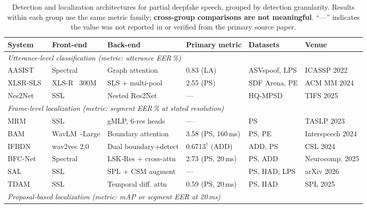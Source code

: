 \documentclass[journal]{IEEEtran}
\begin{document}
\begin{table}[t]
\centering
\caption{Detection and localization architectures for partial deepfake speech, grouped by detection granularity. Results within each group use the same metric family; \textbf{cross-group comparisons are not meaningful}. ``---'' indicates the value was not reported in or verified from the primary source paper.}
\label{tab:architectures}
\small
\begin{tabular}{llllll}
\toprule
\textbf{System} & \textbf{Front-end} & \textbf{Back-end} & \textbf{Primary metric} & \textbf{Datasets} & \textbf{Venue} \\
\midrule
\multicolumn{6}{l}{\textit{Utterance-level classification (metric: utterance EER\,\%)}} \\
\midrule
AASIST~\cite{jung2022aasist}       & Spectral   & Graph attention     & 0.83 (LA)  & ASVspoof, LPS         & ICASSP 2022 \\
XLSR-SLS~\cite{zhang2024xlrsls}    & XLS-R~\cite{babu2022xlsr} 300M & SLS + multi-pool    & 2.55 (PS)  & SDF Arena, PE         & ACM MM 2024 \\
Nes2Net~\cite{liu2025nes2net}      & SSL        & Nested Res2Net      & ---        & HQ-MPSD               & TIFS 2025 \\
\midrule
\multicolumn{6}{l}{\textit{Frame-level localization (metric: segment EER\,\% at stated resolution)}} \\
\midrule
MRM~\cite{zhang2023partialspoof}   & SSL        & gMLP, 6-res heads   & ---                  & PS             & TASLP 2023 \\
BAM~\cite{zhong2024bam}            & WavLM~\cite{chen2022wavlm}-Large & Boundary attention  & 3.58 (PS, 160\,ms)  & PS, PE         & Interspeech 2024 \\
IFBDN~\cite{cai2024ifbdn}          & wav2vec 2.0~\cite{baevski2020wav2vec2} & Dual boundary+detect & 0.6713$^\dag$ (ADD)  & ADD, PS        & CSL 2024 \\
BFC-Net~\cite{zhou2025bfcnet}      & Spectral   & LSK-Res + cross-attn & 2.73 (PS, 20\,ms)  & PS, ADD        & Neurocomp. 2025 \\
SAL~\cite{sal2026}                 & SSL        & SPL + CSM augment    & ---                 & PS, HAD, LPS   & arXiv 2026 \\
TDAM~\cite{li2025tdam}             & SSL        & Temporal diff. attn  & 0.59 (PS, 20\,ms)  & PS, HAD        & SPL 2025 \\
\midrule
\multicolumn{6}{l}{\textit{Proposal-based localization (metric: mAP or segment EER at 20\,ms)}} \\

\end{tabular}
\end{table}
\end{document}

